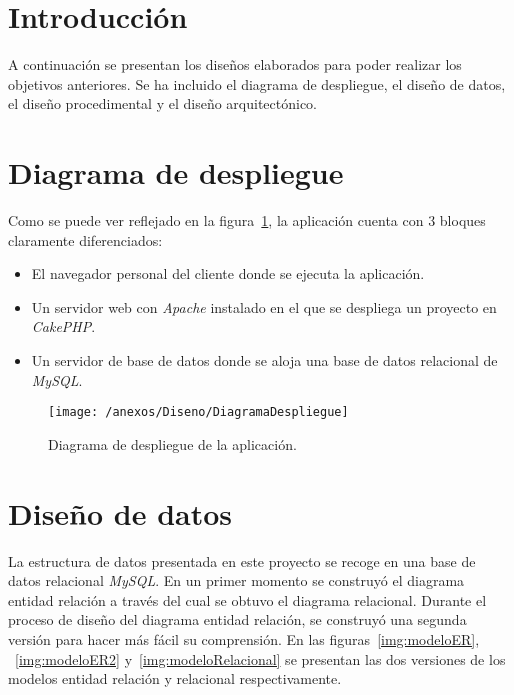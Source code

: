
\section{Introducción}

A continuación se presentan los diseños elaborados para poder realizar los objetivos anteriores. Se ha incluido el diagrama de despliegue, el diseño de datos, el diseño procedimental y el diseño arquitectónico.

\section{Diagrama de despliegue}

Como se puede ver reflejado en la figura~\ref{img:diagramaDespliegue}, la aplicación cuenta con 3 bloques claramente diferenciados:

\begin{itemize}
	\item El navegador personal del cliente donde se ejecuta la aplicación. 
	\item Un servidor web con \textit{Apache} instalado en el que se despliega un proyecto en \textit{CakePHP}.
	\item Un servidor de base de datos donde se aloja una base de datos relacional de \textit{MySQL}.
\end{itemize}

\begin{figure}[h]
	\centering
	\texttt{[image: /anexos/Diseno/DiagramaDespliegue]}
	\caption{Diagrama de despliegue de la aplicación.}
	\label{img:diagramaDespliegue}
\end{figure}

\section{Diseño de datos}

La estructura de datos presentada en este proyecto se recoge en una base de datos relacional \textit{MySQL}. En un primer momento se construyó el diagrama entidad relación a través del cual se obtuvo el diagrama relacional. Durante el proceso de diseño del diagrama entidad relación, se construyó una segunda versión para hacer más fácil su comprensión. En las figuras~\ref{img:modeloER}, ~\ref{img:modeloER2} y~\ref{img:modeloRelacional} se presentan las dos versiones de los modelos entidad relación y relacional respectivamente.

